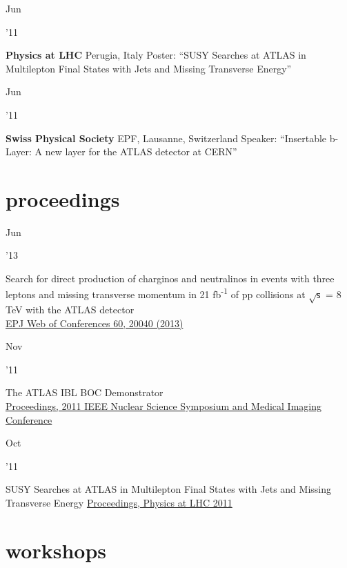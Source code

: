\documentclass[]{cv} %
\begin{document}
\begin{entrylist}
  \entry
  {\parbox[t]{\parboxWidthOne}{Jun}\parbox[t]{\parboxWidthTwo}{\hfill '11}}
  {\textbf{Physics at LHC}}
  {Perugia, Italy}
  {Poster: ``SUSY Searches at ATLAS in Multilepton Final States with Jets and Missing Transverse Energy''}

  \entry
  {\parbox[t]{\parboxWidthOne}{Jun}\parbox[t]{\parboxWidthTwo}{\hfill '11}}
  {\textbf{Swiss Physical Society}}
  {EPF, Lausanne, Switzerland}
  {Speaker: ``Insertable b-Layer: A new layer for the ATLAS detector at CERN''}

\end{entrylist}

\section{proceedings}

\begin{entrylist}

  \entry
  {\parbox[t]{\parboxWidthOne}{Jun}\parbox[t]{\parboxWidthTwo}{\hfill '13}}
  {Search for direct production of charginos and neutralinos in events with
  three leptons and missing transverse momentum in 21 fb\textsuperscript{-1} of
  pp collisions at $\sqrt{\mathsf{s}}$ = 8 TeV with the ATLAS detector\\}
  {\href{https://doi.org/10.1051/epjconf/20136020040}{EPJ Web of Conferences 60, 20040 (2013)}}
  {\vspace*{\spacingPubs}}

  \entry
  {\parbox[t]{\parboxWidthOne}{Nov}\parbox[t]{\parboxWidthTwo}{\hfill '11}}
  {The ATLAS IBL BOC Demonstrator\\}
  {\href{http://ieeexplore.ieee.org/xpl/mostRecentIssue.jsp?punumber=6144196}{Proceedings, 2011 IEEE Nuclear Science Symposium and Medical Imaging Conference}}
  {\vspace*{\spacingPubs}}

  \entry
  {\parbox[t]{\parboxWidthOne}{Oct}\parbox[t]{\parboxWidthTwo}{\hfill '11}}
  {SUSY Searches at ATLAS in Multilepton Final States with Jets and Missing Transverse Energy}
  {\href{http://www.slac.stanford.edu/econf/C1106061}{Proceedings, Physics at LHC 2011}}
  {\vspace*{\spacingPubs}}

\end{entrylist}

\newpage

\section{workshops}
\end{document}
